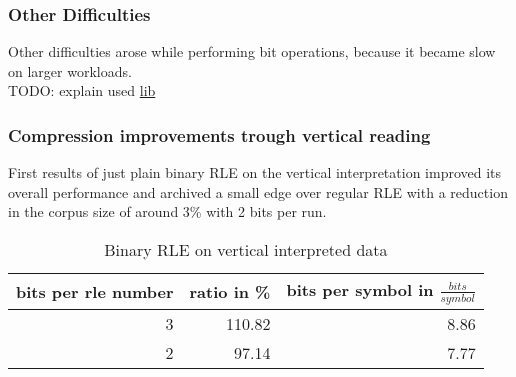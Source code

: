 \subsubsection{Other Difficulties}
\par{
Other difficulties arose while performing bit operations, because it became slow on larger workloads. \\

TODO: explain used \href{https://discuss.kotlinlang.org/t/i-o-streams-for-kotlin/9802}{lib}}

\subsubsection{Compression improvements trough vertical reading}
\par{
First results of just plain binary RLE on the vertical interpretation improved its overall performance and archived a small edge over regular RLE with a reduction in the corpus size of around 3\% with 2 bits per run. 
\begin{table}[H]
	\centering
	\begin{tabular}{r|r|r}	
		bits per rle number & ratio in \% & bits per symbol in $\frac{bits}{symbol}$\\
		\hline
		3 & 110.82 & 8.86\\
		2 & 97.14 & 7.77 \\
	\end{tabular}
	\caption{Binary RLE on vertical interpreted data}
	\label{tab:t30 binary RLE on vertical interpreted data}
\end{table}
}

